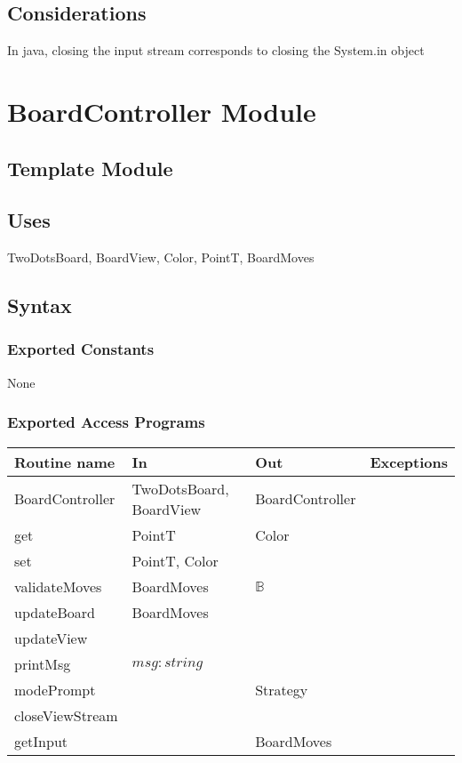 \documentclass[12pt]{article}
\begin{document}
\subsection* {Considerations}
\noindent In java, closing the input stream corresponds to closing the System.in object


\newpage

\section* {BoardController Module}

\subsection* {Template Module}


\subsection* {Uses}

TwoDotsBoard, BoardView, Color, PointT, BoardMoves

\subsection* {Syntax}

\subsubsection* {Exported Constants}

None

\subsubsection* {Exported Access Programs}

\begin{tabular}{| l | l | l | p{6cm} |}
\hline
\textbf{Routine name} & \textbf{In} & \textbf{Out} & \textbf{Exceptions}\\
\hline
BoardController & TwoDotsBoard, BoardView & BoardController& \\
\hline
get & PointT & Color & \\
\hline
set & PointT, Color &  & \\
\hline
validateMoves & BoardMoves & $\mathbb{B}$ & \\
\hline
updateBoard & BoardMoves &  & \\
\hline
updateView &   &  & \\
\hline
printMsg & $msg : string$ &  & \\
\hline
modePrompt &  & Strategy & \\
\hline
closeViewStream &  &  & \\
\hline
getInput &  & BoardMoves & \\
\hline

\end{tabular}
\end{document}
